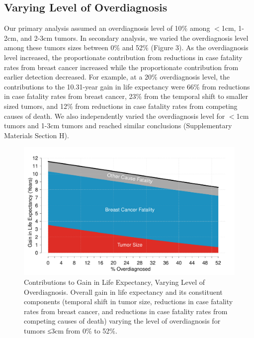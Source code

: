 \documentclass[11pt,letterpaper]{article}
\theoremstyle{plain}
\theoremstyle{remark}
\numberwithin{equation}{section}
\begin{document}
\subsection{Varying Level of Overdiagnosis}  
Our primary analysis assumed an overdiagnosis level of 10\% among
$<$1cm, 1-2cm, and 2-3cm tumors.  In secondary analysis, we varied the
overdiagnosis level among these tumors sizes between 0\% and 52\%
(Figure 3).  As the overdiagnosis level increased, the proportionate
contribution from reductions in case fatality rates from breast cancer
increased while the proportionate contribution from earlier detection
decreased.  For example, at a 20\% overdiagnosis level, the
contributions to the 10.31-year gain in life expectancy were 66\% from
reductions in case fatality rates from breast cancer, 23\% from the
temporal shift to smaller sized tumors, and 12\% from reductions in
case fatality rates from competing causes of death.  We also
independently varied the overdiagnosis level for $<$1cm tumors and 1-3cm
tumors and reached similar conclusions (Supplementary Materials
Section H).
\begin{figure}[h]
\begin{center}
\includegraphics[scale=0.475]{figure3}
\caption{Contributions to Gain in Life Expectancy,
  Varying Level of Overdiagnosis.  Overall gain in life expectancy
  and its constituent components (temporal shift in tumor size,
  reductions in case fatality rates from breast cancer, and reductions
  in case fatality rates from competing causes of death) varying the
  level of overdiagnosis for tumors ≤3cm from 0\% to 52\%.}
\label{fig:simple_case}
\end{center}
\end{figure}
\end{document}
